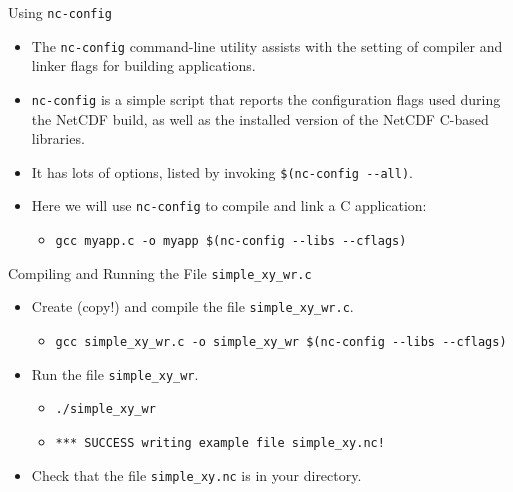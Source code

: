 \documentclass[compress,11pt,xcolor=svgnames,aspectratio=169]{beamer}
\begin{document}
\begin{frame}[fragile]{Using \texttt{nc-config}}

\begin{itemize}
\setlength\itemsep{0.5cm}

\item The \verb|nc-config| command-line utility assists with the setting of compiler and linker flags for building applications.

\item \verb|nc-config| is a simple script that reports the configuration flags used during the NetCDF build, as well as the installed version of the NetCDF C-based libraries.

\item It has lots of options, listed by invoking \verb|$(nc-config --all)|.

\item Here we will use \verb|nc-config| to compile and link a C application:

\begin{itemize}
\setlength\itemsep{0.4cm}
\item \verb|gcc myapp.c -o myapp $(nc-config --libs --cflags)|
\end{itemize}

\end{itemize}

\end{frame}

\begin{frame}[fragile]{Compiling and Running the File \texttt{simple\_xy\_wr.c}}

\begin{itemize}
\setlength\itemsep{0.6cm}

  \item Create (copy!) and compile the file \verb|simple_xy_wr.c|.

    \begin{itemize}
      \item {\footnotesize \verb|gcc simple_xy_wr.c -o simple_xy_wr $(nc-config --libs --cflags)|}
    \end{itemize}

  \item Run the file \verb|simple_xy_wr|.

      \begin{itemize}
      \setlength\itemsep{0.2cm}
        \item {\footnotesize \verb|./simple_xy_wr|}
        \item {\footnotesize \verb|*** SUCCESS writing example file simple_xy.nc!|}
      \end{itemize}

  \item Check that the file \verb|simple_xy.nc| is in your directory.

\end{itemize}

\end{frame}
\end{document}
